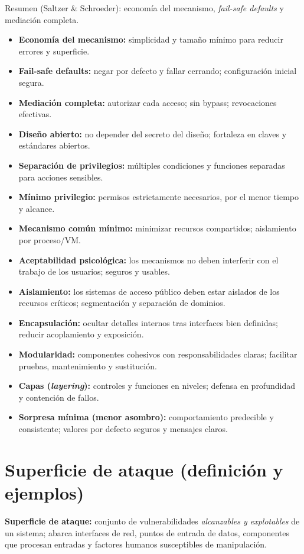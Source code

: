 \documentclass[11pt,a4paper]{article}
\begin{document}
    \begin{NotaBox}
        Resumen (Saltzer \& Schroeder): economía del mecanismo, \textit{fail-safe defaults} y mediación completa.
    \end{NotaBox}

    \begin{itemize}
        \item \textbf{Economía del mecanismo:} simplicidad y tamaño mínimo para reducir errores y superficie.
        \item \textbf{Fail-safe defaults:} negar por defecto y fallar cerrando; configuración inicial segura.
        \item \textbf{Mediación completa:} autorizar cada acceso; sin bypass; revocaciones efectivas.
        \item \textbf{Diseño abierto:} no depender del secreto del diseño; fortaleza en claves y estándares abiertos.
        \item \textbf{Separación de privilegios:} múltiples condiciones y funciones separadas para acciones sensibles.
        \item \textbf{Mínimo privilegio:} permisos estrictamente necesarios, por el menor tiempo y alcance.
        \item \textbf{Mecanismo común mínimo:} minimizar recursos compartidos; aislamiento por proceso/VM.
        \item \textbf{Aceptabilidad psicológica:} los mecanismos no deben interferir con el trabajo de los usuarios; seguros y usables.
        \item \textbf{Aislamiento:} los sistemas de acceso público deben estar aislados de los recursos críticos; segmentación y separación de dominios.
        \item \textbf{Encapsulación:} ocultar detalles internos tras interfaces bien definidas; reducir acoplamiento y exposición.
        \item \textbf{Modularidad:} componentes cohesivos con responsabilidades claras; facilitar pruebas, mantenimiento y sustitución.
        \item \textbf{Capas (\textit{layering}):} controles y funciones en niveles; defensa en profundidad y contención de fallos.
        \item \textbf{Sorpresa mínima (menor asombro):} comportamiento predecible y consistente; valores por defecto seguros y mensajes claros.
    \end{itemize}

    \section{Superficie de ataque (definición y ejemplos)}
    \begin{DefBox}
    \textbf{Superficie de ataque:} conjunto de vulnerabilidades \emph{alcanzables y explotables} de un sistema; abarca interfaces de red, puntos de entrada de datos, componentes que procesan entradas y factores humanos susceptibles de manipulación.
    \end{DefBox}
\end{document}
